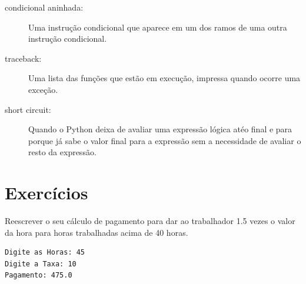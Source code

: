 {\begin{description}
\item[condicional aninhada:] Uma instrução condicional que aparece em um dos 
ramos de uma outra instrução condicional.

\item[traceback:] Uma lista das funções que estão em execução, 
impressa quando ocorre uma exceção.

\item[short circuit:] Quando o Python deixa de avaliar uma expressão 
lógica atéo final e para porque já sabe o valor final para a expressão
sem a necessidade de avaliar o resto da expressão.

\end{description}

\section{Exercícios}

\begin{ex}
Reescrever o seu cálculo de pagamento para dar ao trabalhador 1.5
vezes o valor da hora para
horas trabalhadas acima de 40 horas.

\begin{verbatim}
Digite as Horas: 45
Digite a Taxa: 10
Pagamento: 475.0
\end{verbatim}
\end{ex}

}

